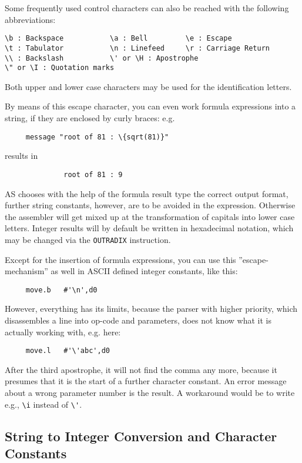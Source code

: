 \documentclass[12pt,twoside]{report}
\newcommand{\tty}[1]{{\tt #1}}
\newcommand{\asname}{{AS}}
\begin{document}
Some frequently used control characters can also be reached with the
following abbreviations:
\begin{verbatim}
\b : Backspace           \a : Bell         \e : Escape
\t : Tabulator           \n : Linefeed     \r : Carriage Return
\\ : Backslash           \' or \H : Apostrophe
\" or \I : Quotation marks
\end{verbatim}
Both upper and lower case characters may be used for the
identification letters.

By means of this escape character, you can even work formula
expressions into a string, if they are enclosed by curly braces: e.g.
\begin{verbatim}
     message "root of 81 : \{sqrt(81)}"
\end{verbatim}
results in
\begin{verbatim}
              root of 81 : 9
\end{verbatim}
\asname{} chooses with the help of the formula result type the correct
output format, further string constants, however, are to be avoided
in the expression.  Otherwise the assembler will get mixed up at the
transformation of capitals into lower case letters.  Integer results will
by default be written in hexadecimal notation, which may be changed via
the \tty{OUTRADIX} instruction.

Except for the insertion of formula expressions, you can use this
''escape-mechanism'' as well in ASCII defined integer constants,
like this:
\begin{verbatim}
     move.b   #'\n',d0
\end{verbatim}
However, everything has its limits, because the parser with higher
priority, which disassembles a line into op-code and parameters, does
not know what it is actually working with, e.g. here:
\begin{verbatim}
     move.l   #'\'abc',d0
\end{verbatim}
After the third apostrophe, it will not find the comma any more,
because it presumes that it is the start of a further character
constant. An error message about a wrong parameter number is the result.
A workaround would be to write e.g., \verb!\i! instead of \verb!\'!.

\subsection{String to Integer Conversion and Character Constants}
\end{document}
